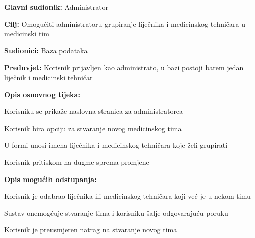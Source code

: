 					\noindent {}
					\begin{packed_item}
	
						\item \textbf{Glavni sudionik: } Administrator
						\item  \textbf{Cilj:} Omogućiti administratoru grupiranje liječnika i medicinskog tehničara u medicinski tim
						\item  \textbf{Sudionici:} Baza podataka
						\item  \textbf{Preduvjet:} Korisnik prijavljen kao administrato, u bazi postoji barem jedan liječnik i medicinski tehničar
						\item  \textbf{Opis osnovnog tijeka:}
						
						\item[] \begin{packed_enum}
	
							\item Korisniku se prikaže naslovna stranica za administratorea
							\item Korisnik bira opciju za stvaranje novog medicinskog tima
							\item U formi unosi imena liječnika i medicinskog tehničara koje želi grupirati
							\item Korisnik pritiskom na dugme sprema promjene
							
						\end{packed_enum}
						
						\item  \textbf{Opis mogućih odstupanja:}
						\item[] \begin{packed_item}
						
							\item[2.a] Korisnik je odabrao liječnika ili medicinskog tehničara koji već je u nekom timu
							\item[] \begin{packed_enum}
								
								\item Sustav onemogćuje stvaranje tima i korisniku šalje odgovarajuću poruku
								\item Korisnik je preusmjeren natrag na stvaranje novog tima
								
							\end{packed_enum}
						\end{packed_item}
					\end{packed_item}
					
